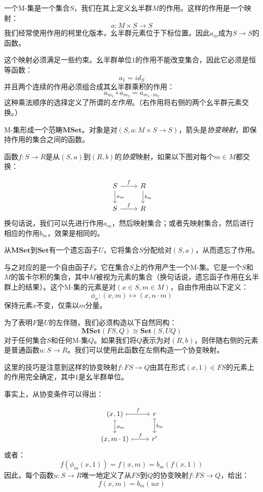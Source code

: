 \documentclass[DaoFP]{subfiles}
\begin{document}
    一个M-集是一个集合$S$，我们在其上定义幺半群$M$的作用。这样的作用是一个映射：
    \[a \colon M \times S \to S \]
    我们经常使用作用的柯里化版本，幺半群元素位于下标位置。因此$a_m$成为$S \to S$的函数。

    这个映射必须满足一些约束。幺半群单位$1$的作用不能改变集合，因此它必须是恒等函数：
    \[ a_1 = id_S \]
    并且两个连续的作用必须组合成其幺半群乘积的作用：
    \[ a_{m_1} \circ a_{m_2} = a_{m_1 \cdot m_2} \]
    这种乘法顺序的选择定义了所谓的\emph{左作用}。（右作用将右侧的两个幺半群元素交换。）

    M-集形成一个范畴$\mathbf{MSet}$。对象是对$(S, a\colon M\times S \to S)$，箭头是\emph{协变映射}，即保持作用的集合之间的函数。

    函数$f \colon S \to R$是从$(S, a)$到$(R, b)$的\emph{协变}映射，如果以下图对每个$m \in M$都交换：

    \[
        \begin{tikzcd}
            S
            \arrow[r, "f"]
            \arrow[d, "a_m"]
            & R
            \arrow[d, "b_m"]
            \\
            S
            \arrow[r, "f"]
            & R
        \end{tikzcd}
    \]
    换句话说，我们可以先进行作用$a_m$，然后映射集合；或者先映射集合，然后进行相应的作用$b_m$，效果是相同的。

    从$\mathbf{MSet}$到$\mathbf{Set}$有一个遗忘函子$U$，它将集合$S$分配给对$(S, a)$，从而遗忘了作用。

    与之对应的是一个自由函子$F$。它在集合$S$上的作用产生一个M-集。它是一个$S$和$M$的笛卡尔积的集合，其中$M$被视为元素的集合（换句话说，遗忘函子作用在幺半群上的结果）。这个M-集的元素是对$(x \in S, m \in M)$，自由作用由以下定义：
    \[ \phi_n \colon (x, m) \mapsto (x, n \cdot m) \]
    保持元素$x$不变，仅乘以$m$分量。

    为了表明$F$是$U$的左伴随，我们必须构造以下自然同构：
    \[ \mathbf{MSet}( F S, Q) \cong \mathbf{Set}(S, U Q) \]
    对于任何集合$S$和任何M-集$Q$。如果我们将$Q$表示为对$(R, b)$，则伴随右侧的元素是普通函数$u \colon S \to R$。我们可以使用此函数在左侧构造一个协变映射。

    这里的技巧是注意到这样的协变映射$f \colon F S \to Q$由其在形式$(x, 1) \in F S$的元素上的作用完全确定，其中$1$是幺半群单位。

    事实上，从协变条件可以得出：

    \[
        \begin{tikzcd}
        (x, 1)
            \arrow[r, mapsto, "f"]
            \arrow[d, mapsto, "\phi_m"]
            & r
            \arrow[d, mapsto, "b_m"]
            \\
            (x, m \cdot 1)
            \arrow[r, mapsto, "f"]
            & r'
        \end{tikzcd}
    \]
    或者：
    \[ f( \phi_m (x, 1)) = f (x, m) = b_m ( f (x, 1)) \]
    因此，每个函数$u \colon S \to R$唯一地定义了从$F S$到$Q$的协变映射$f \colon F S \to Q$，给出：
    \[ f (x, m) = b_m (u x) \]
\end{document}
